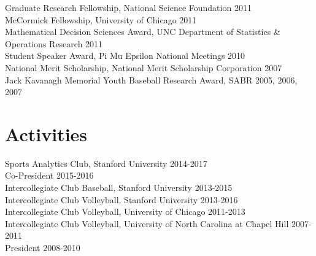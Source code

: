 \documentclass{article}
\begin{document}
Graduate Research Fellowship, National Science Foundation \hfill 2011\\
McCormick Fellowship, University of Chicago \hfill 2011\\
Mathematical Decision Sciences Award, UNC Department of Statistics \& Operations Research \hfill 2011\\
Student Speaker Award, Pi Mu Epsilon National Meetings \hfill 2010\\
National Merit Scholarship, National Merit Scholarship Corporation \hfill 2007\\
Jack Kavanagh Memorial Youth Baseball Research Award, SABR \hfill 2005, 2006, 2007

\section*{\sc Activities}

Sports Analytics Club, Stanford University \hfill 2014-2017\\
{\color{gray} \indent Co-President \hfill 2015-2016}\\
Intercollegiate Club Baseball, Stanford University \hfill 2013-2015\\
Intercollegiate Club Volleyball, Stanford University \hfill 2013-2016\\
Intercollegiate Club Volleyball, University of Chicago \hfill 2011-2013\\
Intercollegiate Club Volleyball, University of North Carolina at Chapel Hill \hfill 2007-2011\\
{\color{gray} \indent President \hfill 2008-2010}
\end{document}
